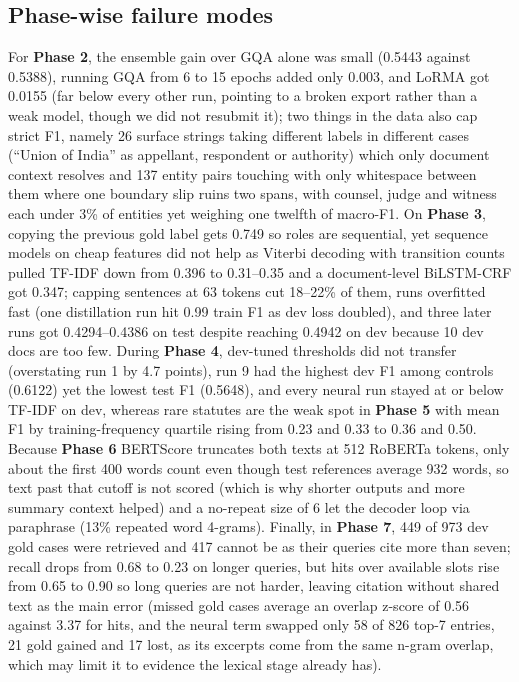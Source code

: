 \documentclass[11pt, oneside]{article}
\begin{document}
\subsection{Phase-wise failure modes}
For \textbf{Phase 2}, the ensemble gain over GQA alone was small (0.5443 against 0.5388), running GQA from 6 to 15 epochs added only 0.003, and LoRMA got 0.0155 (far below every other run, pointing to a broken export rather than a weak model, though we did not resubmit it); two things in the data also cap strict F1, namely 26 surface strings taking different labels in different cases (``Union of India'' as appellant, respondent or authority) which only document context resolves and 137 entity pairs touching with only whitespace between them where one boundary slip ruins two spans, with counsel, judge and witness each under 3\% of entities yet weighing one twelfth of macro-F1. On \textbf{Phase 3}, copying the previous gold label gets 0.749 so roles are sequential, yet sequence models on cheap features did not help as Viterbi decoding with transition counts pulled TF-IDF down from 0.396 to 0.31--0.35 and a document-level BiLSTM-CRF got 0.347; capping sentences at 63 tokens cut 18--22\% of them, runs overfitted fast (one distillation run hit 0.99 train F1 as dev loss doubled), and three later runs got 0.4294--0.4386 on test despite reaching 0.4942 on dev because 10 dev docs are too few. During \textbf{Phase 4}, dev-tuned thresholds did not transfer (overstating run 1 by 4.7 points), run 9 had the highest dev F1 among controls (0.6122) yet the lowest test F1 (0.5648), and every neural run stayed at or below TF-IDF on dev, whereas rare statutes are the weak spot in \textbf{Phase 5} with mean F1 by training-frequency quartile rising from 0.23 and 0.33 to 0.36 and 0.50. Because \textbf{Phase 6} BERTScore truncates both texts at 512 RoBERTa tokens, only about the first 400 words count even though test references average 932 words, so text past that cutoff is not scored (which is why shorter outputs and more summary context helped) and a no-repeat size of 6 let the decoder loop via paraphrase (13\% repeated word 4-grams). Finally, in \textbf{Phase 7}, 449 of 973 dev gold cases were retrieved and 417 cannot be as their queries cite more than seven; recall drops from 0.68 to 0.23 on longer queries, but hits over available slots rise from 0.65 to 0.90 so long queries are not harder, leaving citation without shared text as the main error (missed gold cases average an overlap z-score of 0.56 against 3.37 for hits, and the neural term swapped only 58 of 826 top-7 entries, 21 gold gained and 17 lost, as its excerpts come from the same n-gram overlap, which may limit it to evidence the lexical stage already has).
\end{document}
